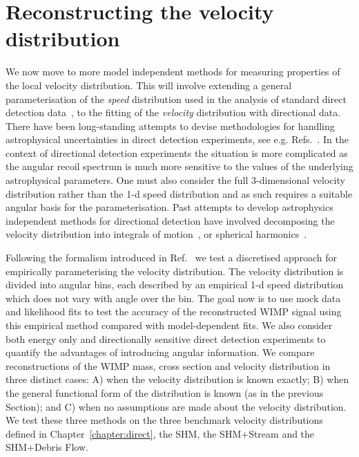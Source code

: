 \section{Reconstructing the velocity distribution}\label{sec:directional_reconstruction}
We now move to more model independent methods for measuring properties of the local velocity distribution. This will involve extending a general parameterisation of the {\it speed} distribution used in the analysis of standard direct detection data~\cite{Peter:2011eu,Kavanagh:2013wba}, to the fitting of the {\it velocity} distribution with directional data. There have been long-standing attempts to devise methodologies for handling astrophysical uncertainties in direct detection experiments, see e.g. Refs.~\cite{Fox:2010bz,Fox:2010bu,Frandsen:2011gi,Gondolo:2012rs,DelNobile:2013cta,Fox:2014kua,Feldstein:2014gza,Anderson:2015xaa,Gelmini:2016pei,Kahlhoefer:2016eds}. In the context of directional detection experiments the situation is more complicated as the angular recoil spectrum is much more sensitive to the values of the underlying astrophysical parameters. One must also consider the full 3-dimensional velocity distribution rather than the 1-d speed distribution and as such requires a suitable angular basis for the parameterisation. Past attempts to develop astrophysics independent methods for directional detection have involved decomposing the velocity distribution into integrals of motion~\cite{Alves:2012ay}, or spherical harmonics~\cite{Lee:2014cpa}.

Following the formalism introduced in Ref.~\cite{Kavanagh:2015aqa} we test a discretised approach for empirically parameterising the velocity distribution. The velocity distribution is divided into angular bins, each described by an empirical 1-d speed distribution which does not vary with angle over the bin. The goal now is to use mock data and likelihood fits to test the accuracy of the reconstructed WIMP signal using this empirical method compared with model-dependent fits. We also consider both energy only and directionally sensitive direct detection experiments to quantify the advantages of introducing angular information. We compare reconstructions of the WIMP mass, cross section and velocity distribution in three distinct cases: A) when the velocity distribution is known exactly; B) when the general functional form of the distribution is known (as in the previous Section); and C) when no assumptions are made about the velocity distribution. We test these three methods on the three benchmark velocity distributions defined in Chapter~\ref{chapter:direct}, the SHM, the SHM+Stream and the SHM+Debris Flow. 

